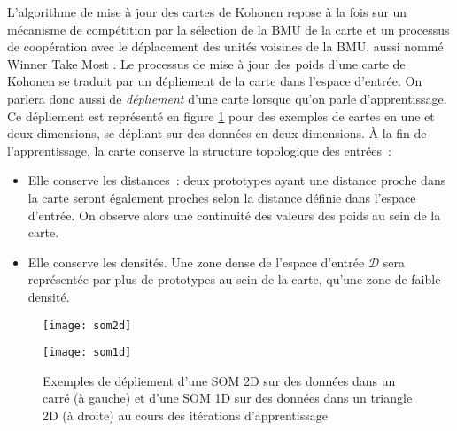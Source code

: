 \documentclass[../main]{subfiles}
\begin{document}
L'algorithme de mise à jour des cartes de Kohonen repose à la fois sur un mécanisme de compétition par la sélection de la BMU de la carte et un processus de coopération avec le déplacement des unités voisines de la BMU, aussi nommé \og Winner Take Most \fg{}.
Le processus de mise à jour des poids d'une carte de Kohonen se traduit par un dépliement de la carte dans l'espace d'entrée. On parlera donc aussi de \emph{dépliement} d'une carte lorsque qu'on parle d'apprentissage. Ce dépliement est représenté en figure \ref{fig:som1d} pour des exemples de cartes en une et deux dimensions, se dépliant sur des données en deux dimensions.
\`A la fin de l'apprentissage, la carte conserve la structure topologique des entrées~:
\begin{itemize}
\item Elle conserve les distances~: deux prototypes ayant une distance proche dans la carte seront également proches selon la distance définie dans l'espace d'entrée. On observe alors une continuité des valeurs des poids au sein de la carte.
\item Elle conserve les densités. Une zone dense de l'espace d'entrée $\mathcal{D}$ sera représentée par plus de prototypes au sein de la carte, qu'une zone de faible densité.
\end{itemize}


\begin{figure}
\begin{minipage}{0.5\textwidth}
\centering
\texttt{[image: som2d]}
\end{minipage}
\begin{minipage}{0.5\textwidth}
\centering
\texttt{[image: som1d]}
\end{minipage}
\caption{Exemples de dépliement d'une SOM 2D sur des données dans un carré (à gauche) et d'une SOM 1D sur des données dans un triangle 2D (à droite) au cours des itérations d'apprentissage \parencite{Kohonen1995SelfOrganizingM}\label{fig:som1d}}
\end{figure}
    
\end{document}
